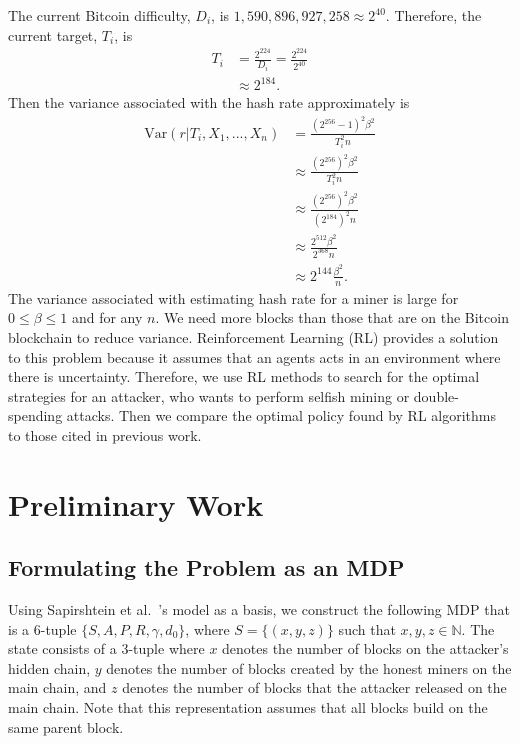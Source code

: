 The current Bitcoin difficulty, $D_i$, is $1,590,896,927,258 \approx 2^{40}$. Therefore, the current target, $T_i$, is
\begin{align}
T_i &= \frac{2^{224}}{D_i} = \frac{2^{224}}{2^{40}} \\
&\approx 2^{184}.
\end{align}
Then the variance associated with the hash rate approximately is
\begin{align}
\text{Var}(r|T_i,X_1,...,X_n) &= \frac{(2^{256}-1)^2\beta^2}{T_i^2n} \\
&\approx  \frac{(2^{256})^2\beta^2}{T_i^2n} \\
&\approx  \frac{(2^{256})^2\beta^2}{(2^{184})^2n} \\
&\approx  \frac{2^{512}\beta^2}{2^{368}n} \\
&\approx  2^{144}\frac{\beta^2}{n}.
\end{align}
The variance associated with estimating hash rate for a miner is large for $0 \leq \beta \leq 1$ and for any $n$. We need more blocks than those that are on the Bitcoin blockchain to reduce variance. Reinforcement Learning (RL) provides a solution to this problem because it assumes that an agents acts in an environment where there is uncertainty. Therefore, we use RL methods to search for the optimal strategies for an attacker, who wants to perform selfish mining or double-spending attacks. Then we compare the optimal policy found by RL algorithms to those cited in previous work.

\section{Preliminary Work}
\subsection{Formulating the Problem as an MDP}
 Using Sapirshtein et al.~\cite{sapirshtein:2015}'s model as a basis, we construct the following MDP that is a 6-tuple $\{S, A, P, R, \gamma, d_0\}$, where $S = \{(x, y, z)\}$ such that $x, y, z \in \mathbb{N}$. The state consists of a 3-tuple where $x$ denotes the number of blocks on the attacker's hidden chain, $y$ denotes the number of blocks created by the honest miners on the main chain, and $z$ denotes the number of blocks that the attacker released on the main chain. Note that this representation assumes that all blocks build on the same parent block. 

